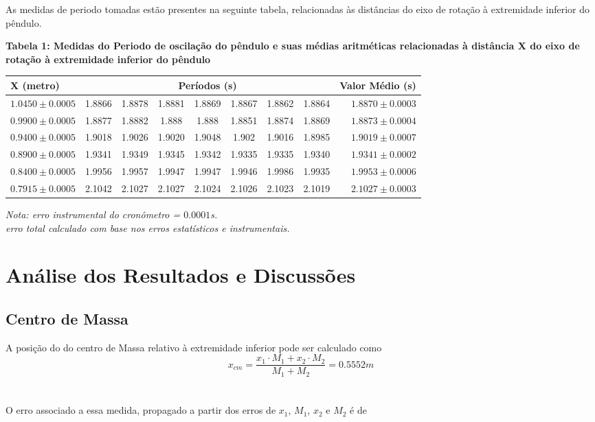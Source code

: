 \documentclass[12pt,a4paper]{article}
\begin{document}
As medidas de periodo tomadas estão presentes na seguinte tabela, relacionadas às distâncias do eixo de rotação à extremidade inferior do pêndulo. \\

\begin{table}[!htbp]
\centering
\textbf {Tabela 1: Medidas do Periodo de oscilação do pêndulo e suas médias aritméticas relacionadas à distância X do eixo de rotação à extremidade inferior do pêndulo}\\ 	%

\def\arraystretch{1.5}
\begin{tabular}{|l| c c c c c c c|r|}
\hline 
X (metro) & \multicolumn{7}{c|}{Períodos (s)} & {Valor Médio (s)} \\ 
\hline
$1.0450\pm0.0005$ & 1.8866 & 1.8878 & 1.8881 & 1.8869 & 1.8867 & 1.8862 & 1.8864 & $1.8870 \pm 0.0003 $ \\
\hline
$0.9900\pm0.0005$ & 1.8877 & 1.8882 & 1.888 & 1.888 & 1.8851 & 1.8874 & 1.8869 & $1.8873 \pm 0.0004 $\\
\hline
$0.9400\pm0.0005$ & 1.9018 & 1.9026 & 1.9020 & 1.9048 & 1.902 & 1.9016 & 1.8985 & $1.9019 \pm 0.0007$\\
\hline
$0.8900\pm0.0005$ & 1.9341 & 1.9349 & 1.9345 & 1.9342 & 1.9335 & 1.9335 & 1.9340 & $1.9341 \pm 0.0002$\\
\hline
$0.8400\pm0.0005$ & 1.9956 & 1.9957 & 1.9947 & 1.9947 & 1.9946 & 1.9986 & 1.9935 & $1.9953 \pm 0.0006$\\
\hline
$0.7915\pm0.0005$ & 2.1042 & 2.1027 & 2.1027 & 2.1024 & 2.1026 & 2.1023 & 2.1019 & $2.1027 \pm 0.0003 $\\
\hline
\end{tabular}

\emph{Nota: erro instrumental do cronômetro = $0.0001$s.\\ erro total calculado com base nos erros estatísticos e instrumentais.}
\end{table}
\newpage


\section{Análise dos Resultados e Discussões}
\subsection{Centro de Massa}
A posição do do centro de Massa relativo à extremidade inferior pode ser calculado como\\
$$ x_{cm} = \frac{x_1 \cdot M_1 + x_2 \cdot M_2}{M_1 + M_2} = 0.5552 m $$\\ \\
O erro associado a essa medida, propagado a partir dos erros de $x_1$, $M_1$, $x_2$ e $M_2$ é de 
\end{document}
